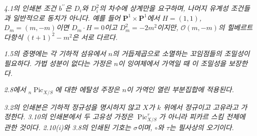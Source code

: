 \par\smallskip
\begingroup\footnotesize





\noindent\textit{4.1의 인쇄본 조건 $b^{\prime\prime}$은 $D_i$와 $D_i^2$의 차수에 상계만을 요구하며, 나머지 유계성 조건들과 일반적으로 동치가 아니다. 예를 들어 $\mathbf P^1\times\mathbf P^1$에서 $H=(1,1)$, $D_m=(m,-m)$이면 $D_m\cdot H=0$이고 $D_m^2=-2m^2$이지만, $\mathcal O(m,-m)$의 힐베르트 다항식 $(t+1)^2-m^2$은 서로 다르다.}\par
\noindent\textit{1.5의 증명에는 각 기하적 섬유에서 $n$의 거듭제곱으로 소멸하는 꼬임점들의 조밀성이 필요하다. 가법 성분이 없다는 가정은 $n$이 잉여체에서 가역일 때 이 조밀성을 보장한다.}\par
\noindent\textit{2.8에서 ${}_n\operatorname{Pic}_{X/S}$에 대한 에탈성 주장은 $n$이 가역인 열린 부분집합에 적용된다.}\par
\noindent\textit{3.2의 인쇄본은 기하적 정규성을 명시하지 않고 $X$가 $k$ 위에서 정규이고 고유라고 가정한다. 3.10의 인쇄본에서 두 고유성 가정은 $\operatorname{Pic}_{X/S}^{\tau}$가 아니라 피카르 스킴 전체에 관한 것이다. 2.10(i)와 3.8의 인쇄된 기호는 $\sigma$이며, $\circ$와 $\tau$는 필사상의 오기이다.}\par
\endgroup
